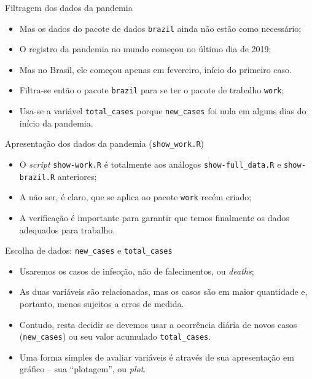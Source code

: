 \documentclass[a4paper,10pt]{beamer}
\begin{document}
\begin{frame}{ Filtragem dos dados da pandemia}
  
  
  \begin{itemize}
      \item Mas os dados do pacote de dados {\tt brazil} ainda não estão como 
	  necessário;
      \item O registro da pandemia no mundo começou no último dia de 2019;
      \item Mas no Brasil, ele começou apenas em fevereiro, início do 
	  primeiro caso.	  
      \item Filtra-se então o pacote {\tt brazil} para se ter o pacote de 
	  trabalho {\tt work};
      \item Usa-se a variável {\tt total\_cases} porque {\tt new\_cases} foi 
	  nula em alguns dias do início da pandemia.
  \end{itemize}

\end{frame}

\begin{frame}{ Apresentação dos dados da pandemia ({\tt show\_work.R}) }
  
  
  \begin{itemize}
      \item O {\em script} {\tt show-work.R} é totalmente aos análogos 
	  {\tt show-full\_data.R} e {\tt show-brazil.R} anteriores;
      \item A não ser, é claro, que se aplica ao pacote {\tt work} recém criado;
      \item A verificação é importante para garantir que temos finalmente os
	  dados adequados para trabalho.
  \end{itemize}

\end{frame}

\begin{frame}{ Escolha de dados: {\tt new\_cases} e {\tt total\_cases} }
  \begin{itemize}
      \item Usaremos os casos de infecção, não de falecimentos, ou {\em deaths};
      \item As duas variáveis são relacionadas, mas os casos são em 
	  maior quantidade e, portanto, menos sujeitos a erros de medida.
      \item Contudo, resta decidir se devemos usar a ocorrência diária de 
	  novos casos ({\tt new\_cases}) ou seu valor acumulado 
	  {\tt total\_cases}.	
      \item Uma forma simples de avaliar variáveis é através de sua 
	  apresentação em gráfico -- sua ``plotagem'', ou {\em plot}.
  \end{itemize}

\end{frame}
\end{document}
